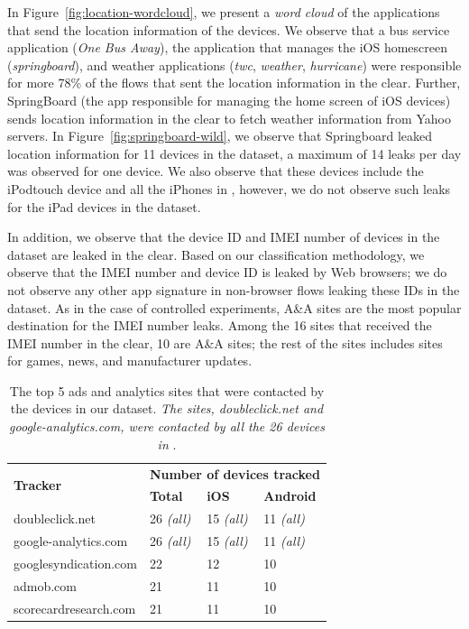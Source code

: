 In Figure~\ref{fig:location-wordcloud}, we present a \emph{word cloud} of
the applications that send the location information of the devices.
We observe that a bus service application (\emph{One Bus Away}), the
application that manages the iOS homescreen (\emph{springboard}), and
weather applications (\emph{twc}, \emph{weather}, \emph{hurricane})
were responsible for more 78\% of the flows that sent the location
information in the clear. 
Further, SpringBoard (the app responsible for managing the home screen of iOS devices) sends location information in the clear to fetch weather information from Yahoo servers. 
In Figure~\ref{fig:springboard-wild}, we observe that Springboard leaked location information for 11 devices in the \mobWild dataset, a maximum of 14 leaks per day was observed for one device. 
We also observe that these devices include the iPodtouch device and all the iPhones in \mobWild, however, we do not observe such leaks for the iPad devices in the \mobWild dataset.  


In addition, we observe that the device ID and IMEI number of
devices in the \mobWild dataset are leaked in the clear.  Based on our
classification methodology, we observe that the IMEI number and device
ID is leaked by Web browsers; we do not observe any other app 
signature in non-browser flows leaking these IDs in the \mobWild dataset.  As in the case of
controlled experiments, A\&A sites are the most popular
destination for the IMEI number leaks.  Among the 16 sites that received 
the IMEI number in the clear, 10 are A\&A sites;
the rest of the sites includes sites for games, news, and manufacturer
updates.

\begin{table}
\centering
\begin{small}
\begin{tabular}{|p{}|p{}|p{}|p{}|}
\hline
\multirow{2}{*}{\bf Tracker} & \multicolumn{3}{c|}{\bf Number of devices tracked}\tabularnewline
\cline{2-4}
                      &  {\bf Total} & {\bf iOS} & {\bf Android} \tabularnewline
\hline
doubleclick.net       & 26 {\em(all)} & 15 {\em(all)} & 11 {\em(all)} \tabularnewline
\hline
google-analytics.com  & 26 {\em(all)} & 15 {\em(all)}  & 11 {\em(all)} \tabularnewline
\hline
googlesyndication.com & 22 & 12 & 10 \tabularnewline
\hline
admob.com             & 21 & 11 & 10 \tabularnewline
\hline
scorecardresearch.com &  21 & 11 & 10 \tabularnewline
\hline
\end{tabular}
\end{small}
\caption{The top 5 ads and analytics sites that were contacted by the devices in our dataset.
\emph{The sites, doubleclick.net and google-analytics.com, were contacted by all the 26 devices in} \mobWild.}
\label{tab:top-trackers}
\end{table}

